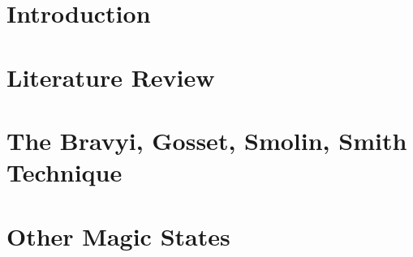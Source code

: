 \documentclass[11pt,a4paper,twoside]{report}
\theoremstyle{plain}%
\theoremstyle{definition}
\theoremstyle{remark}
\begin{document}
{}

\restoregeometry
\begin{abstract}
   
\end{abstract}
\tableofcontents
\pagebreak
\chapter{Introduction}

\chapter{Literature Review}

\chapter{The Bravyi, Gosset, Smolin, Smith Technique}

\chapter{Other Magic States}


\end{document}

